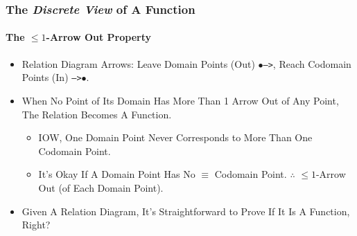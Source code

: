 \begin{frame}
\frametitle{The \textit{Discrete View} of A Function} 
\framesubtitle{The $\leq 1$-Arrow Out Property}
\label{slide:le1ao}
\begin{itemize}
\pause
\item Relation Diagram Arrows: Leave \alert{Domain Points (Out) \texttt{$\bullet$--->}}, Reach \alert{Codomain Points (In) \texttt{--->$\bullet$}}.
\pause
\item When \alert{No Point of Its Domain Has More Than 1 Arrow Out of Any Point}, The Relation Becomes \alert{A Function}.
\begin{itemize}
\pause
\item IOW, \alert{One Domain Point Never Corresponds to More Than One Codomain Point}.
\pause
\item It's Okay If A Domain Point Has No $\equiv$ Codomain Point. $\therefore$ \alert{$\leq 1$-Arrow Out} (of Each Domain Point).
\end{itemize}
\pause
\item Given A Relation Diagram, It's Straightforward to Prove If It Is A Function, Right?
\end{itemize}
\end{frame}
